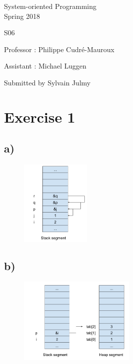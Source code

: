 \documentclass[a4paper,11pt]{report}
\author{Sylvain Julmy}
\date{\today}
\begin{document}
\begin{center}
  \Large{
    System-oriented Programming\\
    Spring 2018
  }
  
  \noindent\makebox[\linewidth]{\rule{\linewidth}{0.4pt}}
  S06
  \noindent\makebox[\linewidth]{\rule{\linewidth}{0.4pt}}

  \begin{flushleft}
    Professor : Philippe Cudré-Mauroux

    Assistant : Michael Luggen
  \end{flushleft}
  
  \noindent\makebox[\linewidth]{\rule{\linewidth}{0.4pt}}

  Submitted by Sylvain Julmy
  
  \noindent\makebox[\linewidth]{\rule{\textwidth}{1pt}}
\end{center}

\section*{Exercise 1}

\subsection*{a)}

\begin{figure}[h]
  \centering
  \includegraphics[width=0.3\textwidth]{figures/SOP_s06_ex1_a}
  \caption{\label{fig:ex1-a}}
\end{figure}

\FloatBarrier

\subsection*{b)}

\begin{figure}[h]
  \centering
  \includegraphics[width=0.5\textwidth]{figures/SOP_s06_ex1_b}
  \caption{\label{fig:ex1-b}}
\end{figure}
\end{document}
